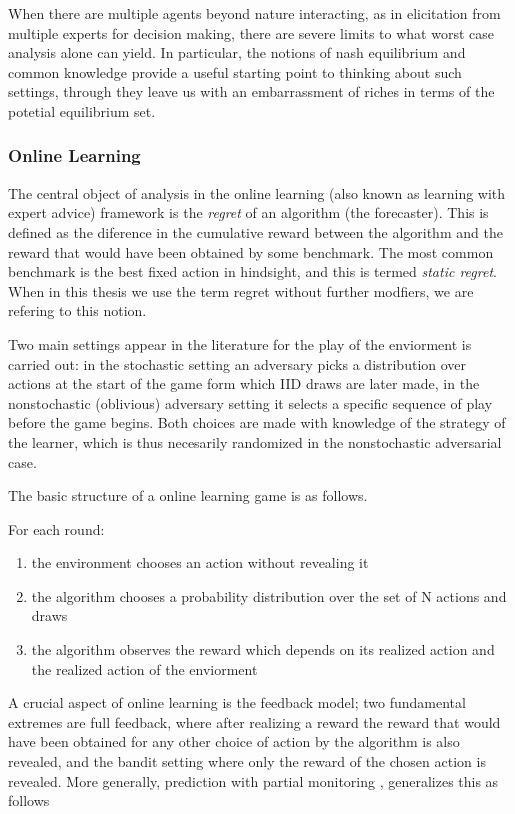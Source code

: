 When there are multiple agents beyond nature interacting, as in elicitation from multiple experts for decision making, there are severe limits to what worst case analysis alone can yield. 
In particular, the notions of nash equilibrium \cite{nash1950equilibrium} and common knowledge \cite{aumann1976agreeing} provide a useful starting point to thinking about such settings, through they leave us with an embarrassment of riches in terms of the potetial equilibrium set.



\subsubsection{Online Learning}


The central object of analysis in the online learning (also known as learning with expert advice) framework is the \emph{regret} of an algorithm (the forecaster). This is defined as the diference in the cumulative reward between the algorithm and the reward that would have been obtained by some benchmark. 
The most common benchmark is the best fixed action in hindsight, and this is termed \emph{static regret}. 
When in this thesis we use the term regret without further modfiers, we are refering to this notion.

Two main settings appear in the literature for the play of the enviorment is carried out: in the stochastic setting an adversary picks a distribution over actions at the start of the game form which IID draws are later made, in the nonstochastic (oblivious) adversary setting it selects a specific sequence of play before the game begins. Both choices are made with knowledge of the strategy of the learner, which is thus necesarily randomized in the nonstochastic adversarial case.

The basic structure of a online learning game is as follows.

For each round:
\begin{enumerate}
\item the environment chooses an action without revealing it
\item the algorithm chooses a probability distribution over the set of N actions and draws
\item the algorithm observes the reward which depends on its realized action and the realized action of the enviorment
\end{enumerate}

A crucial aspect of online learning is the feedback model; two fundamental extremes are full feedback, where after realizing a reward the reward that would have been obtained for any other choice of action  by the algorithm is also revealed, and the bandit setting where only the reward of the chosen action is revealed. 
More generally, prediction with partial monitoring \cite{cesa2006regret}, generalizes this as follows


